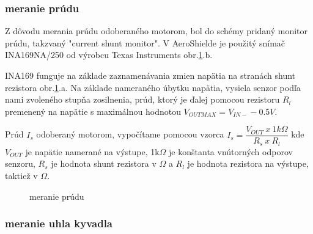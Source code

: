 \subsubsection{meranie prúdu}
\label{merprud}

Z dôvodu merania prúdu odoberaného motorom, bol do schémy pridaný monitor prúdu, takzvaný "current shunt monitor". V AeroShielde je použitý snímač INA169NA/250 od výrobcu Texas Instruments obr.\ref{OBRAZOK 2.3.2}.b.

INA169 funguje na základe zaznamenávania zmien napätia na stranách shunt rezistora obr.\ref{OBRAZOK 2.3.2}.a. Na základe nameraného úbytku napätia, vysiela senzor podľa nami zvoleného stupňa zosilnenia, prúd, ktorý je ďalej pomocou rezistoru $R_{l}$ premenený na napätie s maximálnou hodnotou $V_{OUTMAX} = V_{IN-} - 0.5V $.

Prúd $I_{s}$ odoberaný motorom, vypočítame pomocou vzorca $I_{s} = \dfrac{V_{OUT}\: x \: 1k\Omega}{R_{s} \: x \: R_{l}} $ kde $V_{OUT}$ je napätie namerané na výstupe, 1k$\Omega$ je konštanta vnútorných odporov senzoru, $R_{s}$ je hodnota shunt rezistora v $\Omega$ a $R_{l}$ je hodnota rezistora na výstupe, taktiež v $\Omega$\cite{INA}.

\begin{figure}[!tbh]
	\hfill
	\hfill
	\hfill
	\caption{meranie prúdu}\label{OBRAZOK 2.3.2}
\end{figure}


\label{Hall}
\pagebreak

\subsubsection{meranie uhla kyvadla}
\label{meruhl}

